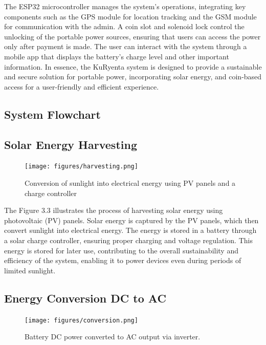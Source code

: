 {The ESP32 microcontroller manages the system's operations, integrating key components such as the GPS module for location tracking and the GSM module for communication with the admin. A coin slot and solenoid lock control the unlocking of the portable power sources, ensuring that users can access the power only after payment is made. The user can interact with the system through a mobile app that displays the battery's charge level and other important information. In essence, the KuRyenta system is designed to provide a sustainable and secure solution for portable power, incorporating solar energy, and coin-based access for a user-friendly and efficient experience.


\subsection{System  Flowchart}



\subsection{Solar Energy Harvesting}

\begin{figure}[H]
	\centering
	\caption{Conversion of sunlight into electrical energy using PV panels and a charge controller}
	\label{fig:solar harvesting}
	\texttt{[image: figures/harvesting.png]}
\end{figure}

The Figure 3.3 illustrates the process of harvesting solar energy using photovoltaic (PV) panels. Solar energy is captured by the PV panels, which then convert sunlight into electrical energy. The energy is stored in a  battery through a solar charge controller, ensuring proper charging and voltage regulation. This energy is stored for later use, contributing to the overall sustainability and efficiency of the system, enabling it to power devices even during periods of limited sunlight.

\subsection{Energy Conversion DC to AC}

\begin{figure}[H]
	\centering
	\caption{Battery DC power converted to AC output via inverter.}
	\label{fig:energy conversion}
	\texttt{[image: figures/conversion.png]}
\end{figure}

}
